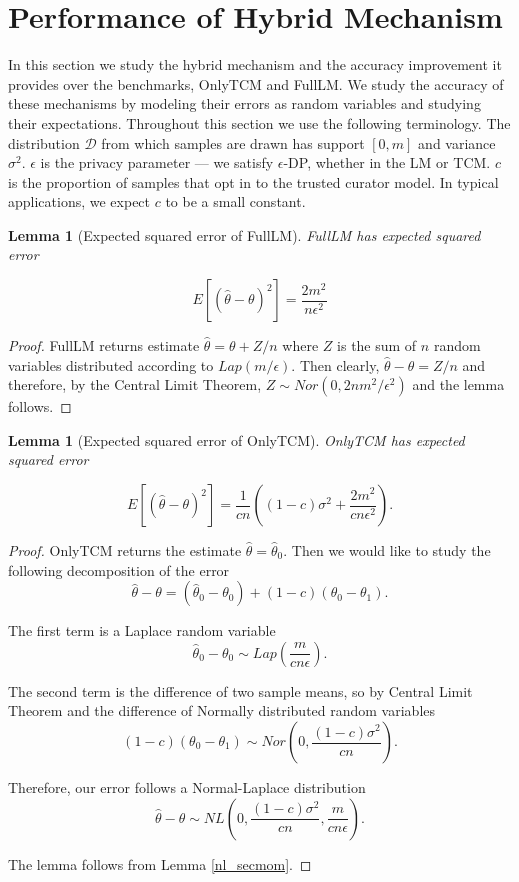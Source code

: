 \documentclass{article}
\theoremstyle{plain}
\newtheorem{lem}[thm]{Lemma}
\begin{document}
\section{Performance of Hybrid Mechanism}

In this section we study the hybrid mechanism and the accuracy improvement it provides over the benchmarks, OnlyTCM and FullLM. We study the accuracy of these mechanisms by modeling their errors as random variables and studying their expectations. Throughout this section we use the following terminology. The distribution $\mathcal{D}$ from which samples are drawn has support $[0,m]$ and variance $\sigma^2$. $\epsilon$ is the privacy parameter — we satisfy $\epsilon$-DP, whether in the LM or TCM. $c$ is the proportion of samples that opt in to the trusted curator model. In typical applications, we expect $c$ to be a small constant. 

\begin{lem}[Expected squared error of FullLM]
\label{MSE_FullLM}
FullLM has expected squared error

$$E[(\hat{\theta} - \theta)^2] = \frac{2m^2}{n\epsilon^2}$$
\end{lem}

\begin{proof}
FullLM returns estimate $\hat{\theta} = \theta + Z/n$ where $Z$ is the sum of $n$ random variables distributed according to $Lap(m/\epsilon)$. Then clearly, $\hat{\theta} - \theta = Z/n$ and therefore, by the Central Limit Theorem, $Z \sim Nor(0, 2nm^2/\epsilon^2)$ and the lemma follows. 
\end{proof}

\begin{lem}[Expected squared error of OnlyTCM]
\label{MSE_OnlyTCM}
OnlyTCM has expected squared error

$$E[(\hat{\theta} - \theta)^2] = \frac{1}{cn}\left((1-c)\sigma^2 + \frac{2m^2}{cn \epsilon^2 }\right).$$
\end{lem}

\begin{proof}
OnlyTCM returns the estimate $\hat{\theta} = \hat{\theta}_0$. Then we would like to study the following decomposition of the error
$$\hat{\theta} - \theta = (\hat{\theta}_0 - \theta_0) + (1-c)(\theta_0 - \theta_1).$$

The first term is a Laplace random variable
$$\hat{\theta}_0 - \theta_0 \sim Lap\left(\frac{m}{cn\epsilon}\right).$$

The second term is the difference of two sample means, so by Central Limit Theorem and the difference of Normally distributed random variables
$$(1-c)(\theta_0 - \theta_1) \sim Nor\left(0, \frac{(1-c)\sigma^2}{cn}\right).$$

Therefore, our error follows a Normal-Laplace distribution
$$\hat{\theta} - \theta \sim NL\left(0, \frac{(1-c)\sigma^2}{cn}, \frac{m}{cn\epsilon} \right).$$

The lemma follows from Lemma \ref{nl_secmom}.
\end{proof}
\end{document}
